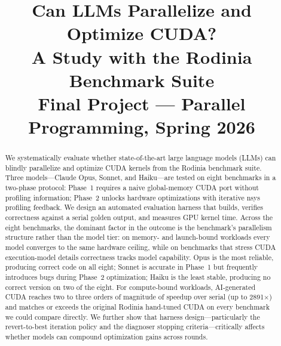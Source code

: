 \documentclass[conference]{IEEEtran}
\begin{document}
\title{Can LLMs Parallelize and Optimize CUDA?\\
A Study with the Rodinia Benchmark Suite\\
{\footnotesize Final Project --- Parallel Programming, Spring 2026}}

\author{%
%
\and
{}
}

\maketitle

\begin{abstract}
We systematically evaluate whether state-of-the-art large language models (LLMs)
can blindly parallelize and optimize CUDA kernels from the Rodinia benchmark
suite. Three models---Claude Opus, Sonnet, and Haiku---are tested on eight
benchmarks in a two-phase protocol: Phase~1 requires a naive global-memory CUDA
port without profiling information; Phase~2 unlocks hardware optimizations with
iterative nsys profiling feedback. We design an automated evaluation harness that
builds, verifies correctness against a serial golden output, and measures GPU
kernel time. Across the eight benchmarks, the dominant factor in the outcome is
the benchmark's parallelism structure rather than the model tier: on memory- and
launch-bound workloads every model converges to the same hardware ceiling, while
on benchmarks that stress CUDA execution-model details correctness tracks model
capability. Opus is the most reliable, producing correct code on all eight;
Sonnet is accurate in Phase~1 but frequently introduces bugs during Phase~2
optimization; Haiku is the least stable, producing no correct version on two of
the eight. For compute-bound workloads, AI-generated CUDA reaches two to three
orders of magnitude of speedup over serial (up to 2891$\times$) and matches or
exceeds the original Rodinia hand-tuned CUDA on every benchmark we could compare
directly. We further show
that harness design---particularly the revert-to-best iteration policy and the
diagnoser stopping criteria---critically affects whether models can compound
optimization gains across rounds.
\end{abstract}
\end{document}
